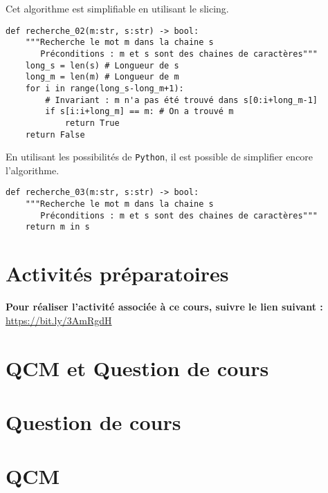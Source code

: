 Cet algorithme est simplifiable en utilisant le slicing.
\begin{lstlisting}
def recherche_02(m:str, s:str) -> bool:
    """Recherche le mot m dans la chaine s
       Préconditions : m et s sont des chaines de caractères"""
    long_s = len(s) # Longueur de s
    long_m = len(m) # Longueur de m
    for i in range(long_s-long_m+1): 
        # Invariant : m n'a pas été trouvé dans s[0:i+long_m-1]
        if s[i:i+long_m] == m: # On a trouvé m
            return True
    return False
\end{lstlisting}

En utilisant les possibilités de \texttt{Python}, il est possible de simplifier encore l'algorithme. 

\begin{lstlisting}
def recherche_03(m:str, s:str) -> bool:
    """Recherche le mot m dans la chaine s
       Préconditions : m et s sont des chaines de caractères"""
    return m in s
\end{lstlisting}

\section{Activités préparatoires}


\textbf{Pour réaliser l'activité associée à ce cours, suivre le lien suivant : }
\url{https://bit.ly/3AmRgdH}

\newpage
\section{QCM et Question de cours}

\section*{Question de cours}


\section*{QCM}





